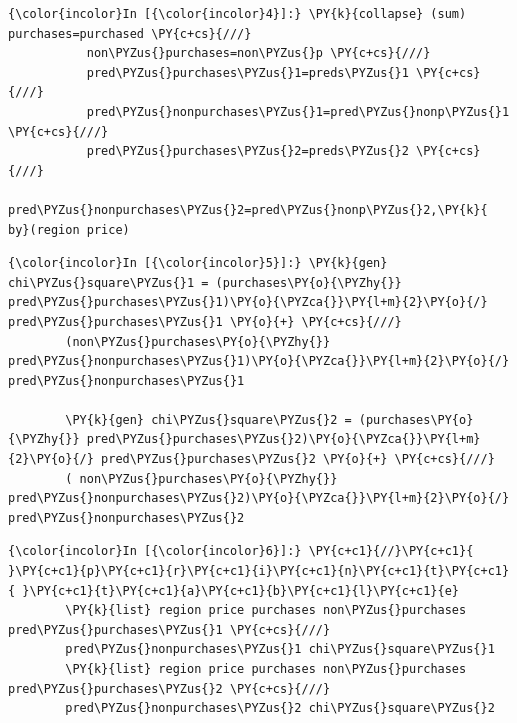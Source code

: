 \documentclass[11pt,notitlepage]{article}\usepackage[]{graphicx}\usepackage[]{color}
\makeatletter
\newenvironment{kframe}{%
 \def\at@end@of@kframe{}%
 \ifinner\ifhmode%
  \def\at@end@of@kframe{\end{minipage}}%
  \begin{minipage}{\columnwidth}%
 \fi\fi%
 \def\FrameCommand##1{\hskip\@totalleftmargin \hskip-\fboxsep
 \colorbox{shadecolor}{##1}\hskip-\fboxsep
     \hskip-\linewidth \hskip-\@totalleftmargin \hskip\columnwidth}%
 \MakeFramed {\advance\hsize-\width
   \@totalleftmargin\z@ \linewidth\hsize
   \@setminipage}}%
 {\par\unskip\endMakeFramed%
 \at@end@of@kframe}
\newenvironment{knitrout}{}{} %
\makeatother
\begin{document}
\begin{enumerate}[a)]
\begin{knitrout}
\begin{kframe}
    \begin{Verbatim}[commandchars=\\\{\}]
{\color{incolor}In [{\color{incolor}4}]:} \PY{k}{collapse} (sum) purchases=purchased \PY{c+cs}{///}
           non\PYZus{}purchases=non\PYZus{}p \PY{c+cs}{///}
           pred\PYZus{}purchases\PYZus{}1=preds\PYZus{}1 \PY{c+cs}{///}
           pred\PYZus{}nonpurchases\PYZus{}1=pred\PYZus{}nonp\PYZus{}1 \PY{c+cs}{///}
           pred\PYZus{}purchases\PYZus{}2=preds\PYZus{}2 \PY{c+cs}{///}
           pred\PYZus{}nonpurchases\PYZus{}2=pred\PYZus{}nonp\PYZus{}2,\PY{k}{ by}(region price)
\end{Verbatim}

    \begin{Verbatim}[commandchars=\\\{\}]
{\color{incolor}In [{\color{incolor}5}]:} \PY{k}{gen} chi\PYZus{}square\PYZus{}1 = (purchases\PY{o}{\PYZhy{}} pred\PYZus{}purchases\PYZus{}1)\PY{o}{\PYZca{}}\PY{l+m}{2}\PY{o}{/} pred\PYZus{}purchases\PYZus{}1 \PY{o}{+} \PY{c+cs}{///}
        (non\PYZus{}purchases\PY{o}{\PYZhy{}} pred\PYZus{}nonpurchases\PYZus{}1)\PY{o}{\PYZca{}}\PY{l+m}{2}\PY{o}{/} pred\PYZus{}nonpurchases\PYZus{}1
        
        \PY{k}{gen} chi\PYZus{}square\PYZus{}2 = (purchases\PY{o}{\PYZhy{}} pred\PYZus{}purchases\PYZus{}2)\PY{o}{\PYZca{}}\PY{l+m}{2}\PY{o}{/} pred\PYZus{}purchases\PYZus{}2 \PY{o}{+} \PY{c+cs}{///}
        ( non\PYZus{}purchases\PY{o}{\PYZhy{}} pred\PYZus{}nonpurchases\PYZus{}2)\PY{o}{\PYZca{}}\PY{l+m}{2}\PY{o}{/} pred\PYZus{}nonpurchases\PYZus{}2
\end{Verbatim}

    \begin{Verbatim}[commandchars=\\\{\}]
{\color{incolor}In [{\color{incolor}6}]:} \PY{c+c1}{//}\PY{c+c1}{ }\PY{c+c1}{p}\PY{c+c1}{r}\PY{c+c1}{i}\PY{c+c1}{n}\PY{c+c1}{t}\PY{c+c1}{ }\PY{c+c1}{t}\PY{c+c1}{a}\PY{c+c1}{b}\PY{c+c1}{l}\PY{c+c1}{e}
        \PY{k}{list} region price purchases non\PYZus{}purchases pred\PYZus{}purchases\PYZus{}1 \PY{c+cs}{///}
        pred\PYZus{}nonpurchases\PYZus{}1 chi\PYZus{}square\PYZus{}1
        \PY{k}{list} region price purchases non\PYZus{}purchases pred\PYZus{}purchases\PYZus{}2 \PY{c+cs}{///}
        pred\PYZus{}nonpurchases\PYZus{}2 chi\PYZus{}square\PYZus{}2
\end{Verbatim}


\end{kframe}
\end{knitrout}
\end{enumerate}
\end{document}
